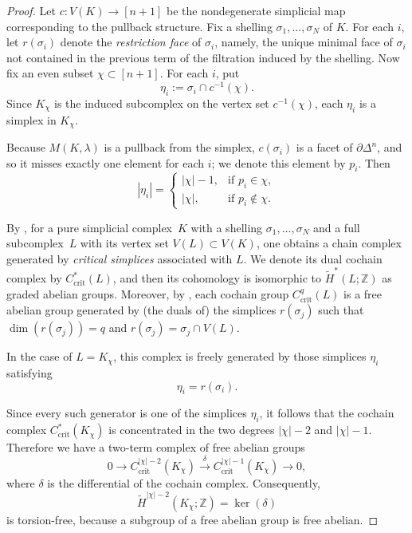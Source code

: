 \documentclass{amsart}
\newcommand{\Z}{\mathbb{Z}}
\DeclareMathOperator{\crit}{crit}
\theoremstyle{plain}
\numberwithin{equation}{section}
\theoremstyle{definition}
\theoremstyle{remark}
\begin{document}
\begin{proof}
    Let $c\colon V(K)\to [n+1]$ be the nondegenerate simplicial map corresponding to the pullback structure.
    Fix a shelling $\sigma_1,\dots,\sigma_N$ of $K$.
    For each $i$, let $r(\sigma_i)$ denote the \emph{restriction face} of $\sigma_i$, namely, the unique minimal face of $\sigma_i$ not contained in the previous term of the filtration induced by the shelling.
    Now fix an even subset $\chi\subset [n+1]$.
    For each $i$, put
    $$
        \eta_i:=\sigma_i\cap c^{-1}(\chi).
    $$
    Since $K_\chi$ is the induced subcomplex on the vertex set $c^{-1}(\chi)$, each $\eta_i$ is a simplex in $K_\chi$.
    
    Because $M(K,\lambda)$ is a pullback from the simplex, $c(\sigma_i)$ is a facet of $\partial \Delta^n$, and so it misses exactly one element for each $i$; we denote this element by $p_i$.
    Then
    $$
        |\eta_i|=
            \begin{cases}
                |\chi|-1, & \text{if } p_i\in \chi,\\[4pt]
                |\chi|, & \text{if } p_i\notin \chi.
            \end{cases}
    $$
    
    By \cite[Lemma~4.4 and Proposition~4.5]{Cai-Choi2021}, for a pure simplicial complex~$K$ with a shelling $\sigma_1, \dots, \sigma_N$ and a full subcomplex~$L$ with its vertex set $V(L) \subset V(K)$, one obtains a chain complex generated by \emph{critical simplices} associated with $L$.
    We denote its dual cochain complex by $C^\ast_{\crit}(L)$, and then its cohomology is isomorphic to $\widetilde{H}^\ast(L ; \Z)$ as graded abelian groups. 
    Moreover, by \cite[Lemma~4.6]{Cai-Choi2021}, each cochain group $C^q_{\crit}(L)$ is a free abelian group generated by (the duals of) the simplices $r(\sigma_j)$ such that $\dim(r(\sigma_j)) = q$ and $r(\sigma_j) = \sigma_j \cap V(L)$.
    
    In the case of $L=K_\chi$, this complex is freely generated by those simplices $\eta_i$ satisfying
    $$
        \eta_i=r(\sigma_i).
    $$
    
    Since every such generator is one of the simplices $\eta_i$, it follows that the cochain complex $C_{\crit}^\ast(K_\chi)$ is concentrated in the two degrees $|\chi|-2$ and $|\chi|-1$.
    Therefore we have a two-term complex of free abelian groups
    $$
        0\longrightarrow C^{|\chi|-2}_{\crit}(K_\chi) \xrightarrow{\ \delta\ } C^{|\chi|-1}_{\crit}(K_\chi) \longrightarrow 0,
    $$
    where $\delta$ is the differential of the cochain complex.
    Consequently,
    $$
        \widetilde H^{|\chi|-2}(K_\chi;\Z)=\ker(\delta)
    $$
    is torsion-free, because a subgroup of a free abelian group is free abelian.
    

\end{proof}
\end{document}
